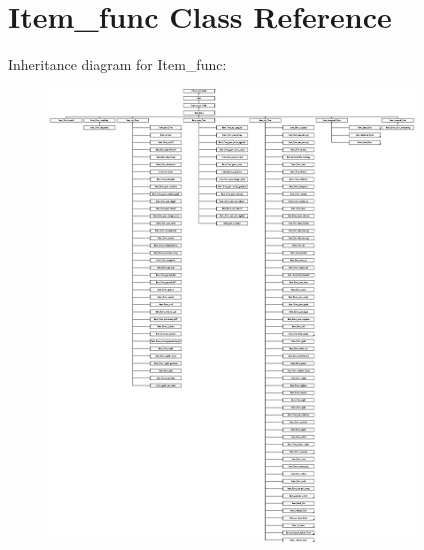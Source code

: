 \hypertarget{classItem__func}{}\section{Item\+\_\+func Class Reference}
\label{classItem__func}
Inheritance diagram for Item\+\_\+func\+:\begin{figure}[H]
\begin{center}
\leavevmode
\includegraphics[height=12.000000cm]{classItem__func}
\end{center}
\end{figure}
